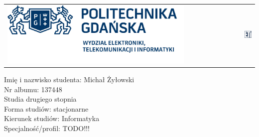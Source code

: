 \documentclass[10pt,a4paper,titlepage,twoside]{report}
\begin{document}
\setlength{\parindent}{1.25cm}



\begin{titlepage}
  \begin{center}


\begin{center}
\begin{tabular}{l l r}
 	\includegraphics[scale=0.26]{pics/pg_weti.png} & \hspace*{5cm} &  \includegraphics[width=0.13\textwidth]{pics/eti.png}\\  
\end{tabular} 
\end{center}

\vspace*{0.5cm}

\begin{flushleft}

	Imię i nazwisko studenta: Michał Żyłowski\\
	\vspace*{0.1cm}
	Nr albumu: 137448\\
	\vspace*{0.1cm}
	Studia drugiego stopnia\\
	\vspace*{0.1cm}
	Forma studiów: stacjonarne\\
	\vspace*{0.1cm}
	Kierunek studiów: Informatyka\\
	\vspace*{0.1cm}	
	Specjalność/profil: TODO!!!\\

	
\end{flushleft}

\vspace*{1.8cm}


\end{center}
\end{titlepage}
\end{document}
